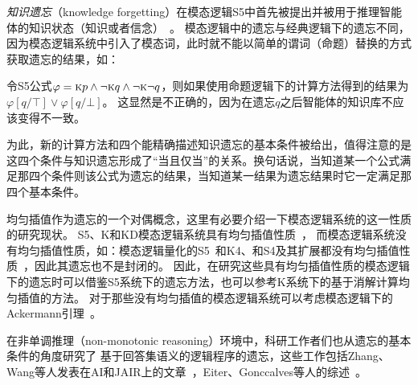 \emph{知识遗忘}（knowledge forgetting）在模态逻辑S5中首先被提出并被用于推理智能体的知识状态（知识或者信念）~\cite{Yan:AIJ:2009}。
模态逻辑中的遗忘与经典逻辑下的遗忘不同，因为模态逻辑系统中引入了模态词，此时就不能以简单的谓词（命题）替换的方式获取遗忘的结果，如：
\begin{example}\cite{Zhang2008Properties}
	令S5公式$\varphi=\textsc{k} p \wedge \neg \textsc{k} q \wedge \neg \textsc{k} \neg q$，则如果使用命题逻辑下的计算方法得到的结果为$\varphi[q/\top] \vee \varphi[q/\bot]$。
	这显然是不正确的，因为在遗忘$q$之后智能体的知识库不应该变得不一致。
\end{example}
为此，新的计算方法和四个能精确描述知识遗忘的基本条件被给出，值得注意的是这四个条件与知识遗忘形成了“当且仅当”的关系。换句话说，当知道某一个公式满足那四个条件则该公式为遗忘的结果，当知道某一结果为遗忘结果时它一定满足那四个基本条件。

均匀插值作为遗忘的一个对偶概念，这里有必要介绍一下模态逻辑系统的这一性质的研究现状。
S5、K和KD模态逻辑系统具有均匀插值性质~\cite{DBLP:journals/aml/Iemhoff19}，
而模态逻辑系统没有均匀插值性质，如：模态逻辑量化的S5~\cite{DBLP:journals/jsyml/Fine79}和K4、和S4及其扩展都没有均匀插值性质~\cite{DBLP:journals/ndjfl/Schumm86}，因此其遗忘也不是封闭的。
因此，在研究这些具有均匀插值性质的模态逻辑下的遗忘时可以借鉴S5系统下的遗忘方法，也可以参考K系统下的基于消解计算均匀插值的方法。
对于那些没有均匀插值的模态逻辑系统可以考虑模态逻辑下的Ackermann引理~\cite{DBLP:books/daglib/0023036}。



在非单调推理（non-monotonic reasoning）环境中，科研工作者们也从遗忘的基本条件的角度研究了
基于回答集语义的逻辑程序的遗忘，这些工作包括Zhang、Wang等人发表在AI和JAIR上的文章~\cite{DBLP:Zhang:AIJ2006,DBLP:journals/ai/EiterW08,Wong:PhD:Thesis,DBLP:journals/jair/WangZZZ14,wang2013forgetting,DBLP:journals/jair/Delgrande17,gonccalves2020limits}，Eiter、Gonccalves等人的综述~\cite{eiter2019brief,gonccalves2021forgetting}。


